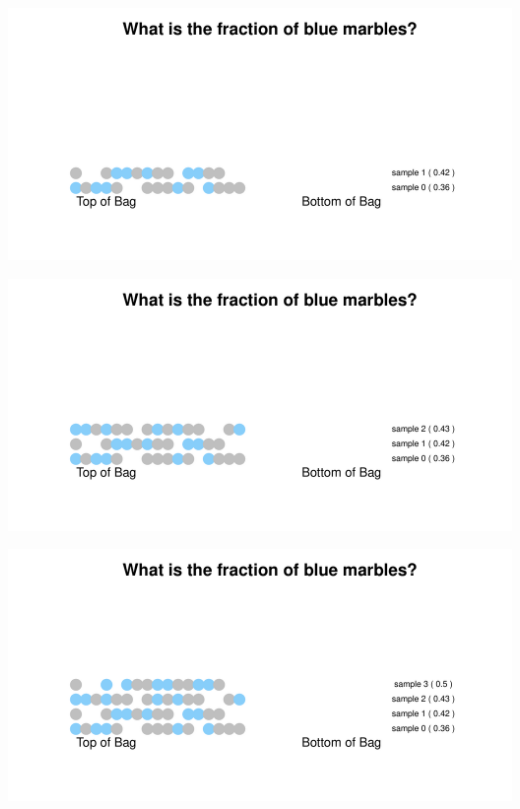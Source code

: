 \documentclass[aspectratio=169]{beamer}
\theoremstyle{principle}
\begin{document}
\begin{frame}
\begin{center}
\includegraphics[scale=0.57]{sample_1.pdf}
\end{center}
\end{frame}

\begin{frame}
\begin{center}
\includegraphics[scale=0.57]{sample_2.pdf}
\end{center}
\end{frame}

\begin{frame}
\begin{center}
\includegraphics[scale=0.57]{sample_3.pdf}
\end{center}
\end{frame}
\end{document}
